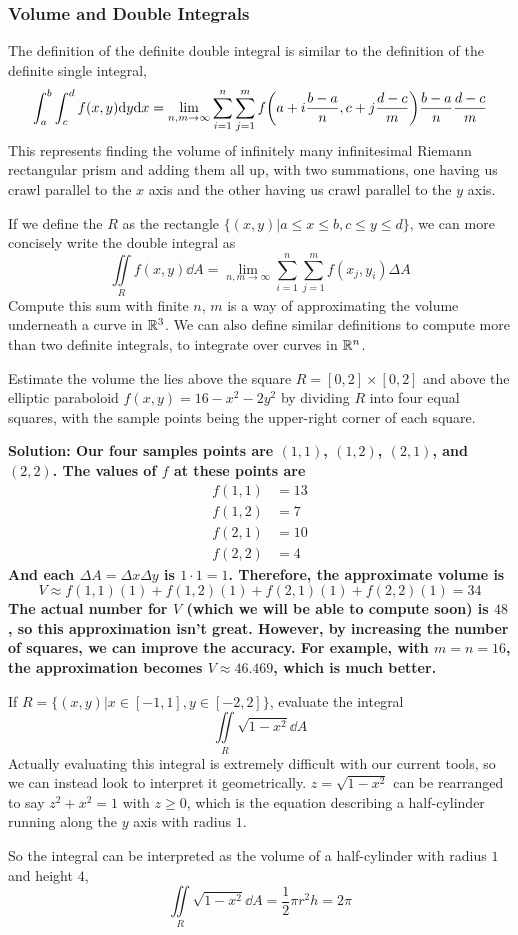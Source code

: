 \subsubsection{Volume and Double Integrals}
The definition of the definite double integral is similar to the definition of the definite single integral,
\[ \int_a^b\int_c^df(x,y)\dd y\dd x = \lim_{n,m\to\infty}\sum_{i=1}^n\sum_{j=1}^mf\pqty{a+i\frac{b-a}{n}, c+j\frac{d-c}{m}}\frac{b-a}{n}\frac{d-c}{m}\]
This represents finding the volume of infinitely many infinitesimal Riemann rectangular prism and adding them all up, with two summations, one having us crawl parallel to the \( x \) axis and the other having us crawl parallel to the \( y \) axis.\par
If we define the \( R \) as the rectangle \( \{ (x, y)|a\leq x\leq b, c\leq y\leq d\} \), we can more concisely write the double integral as 
\[ \iint\limits_Rf(x,y)\dd A = \lim_{n,m\to\infty}\sum_{i=1}^n\sum_{j=1}^mf(x_j, y_i)\Delta A \]
Compute this sum with finite \( n \), \( m \) is a way of approximating the volume underneath a curve in \( \mathbb{R}^3 \). We can also define similar definitions to compute more than two definite integrals, to integrate over curves in \( \mathbb{R}^n \).
\begin{example}
    Estimate the volume the lies above the square \( R=[0,2]\times[0,2] \) and above the elliptic paraboloid \( f(x,y)=16-x^2-2y^2 \) by dividing \( R \) into four equal squares, with the sample points being the upper-right corner of each square.\par\bf{Solution: }Our four samples points are \( (1, 1) \), \( (1, 2) \), \( (2, 1) \), and \( (2,2) \). The values of \( f \) at these points are
    \begin{align*}
        f(1, 1) &= 13 \\
        f(1, 2) &= 7 \\
        f(2, 1) &= 10 \\
        f(2, 2) &= 4
    \end{align*}
    And each \( \Delta A = \Delta x\Delta y \) is \( 1\cdot 1 = 1 \). Therefore, the approximate volume is
    \[ V \approx f(1,1)(1) + f(1,2)(1) + f(2,1)(1) + f(2,2)(1) = 34 \]
    The actual number for \( V \) (which we will be able to compute soon) is \( 48 \), so this approximation isn't great. However, by increasing the number of squares, we can improve the accuracy. For example, with \( m=n=16 \), the approximation becomes \( V\approx 46.469 \), which is much better.
\end{example} 
\begin{example}
    If \( R = \{(x,y)| x\in [-1, 1], y\in[-2, 2]\} \), evaluate the integral
    \[ \iint\limits_R\sqrt{1-x^2}\dd A\]
    Actually evaluating this integral is extremely difficult with our current tools, so we can instead look to interpret it geometrically. \( z=\sqrt{1-x^2} \) can be rearranged to say \( z^2+x^2=1 \) with \( z\geq 0 \), which is the equation describing a half-cylinder running along the \( y \) axis with radius \( 1 \). \par
    So the integral can be interpreted as the volume of a half-cylinder with radius \( 1 \) and height \( 4 \), 
    \[ \iint\limits_R\sqrt{1-x^2}\dd A = \frac{1}{2}\pi r^2h = 2\pi \]
\end{example}
